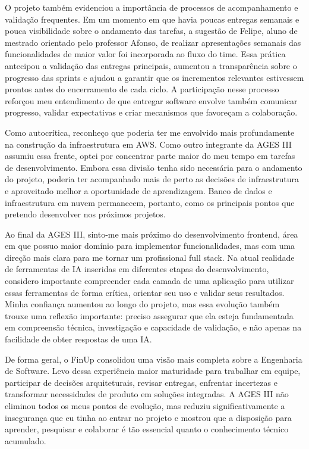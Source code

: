 O projeto também evidenciou a importância de processos de acompanhamento e
validação frequentes. Em um momento em que havia poucas entregas semanais e
pouca visibilidade sobre o andamento das tarefas, a sugestão de Felipe, aluno de
mestrado orientado pelo professor Afonso, de realizar apresentações semanais das
funcionalidades de maior valor foi incorporada ao fluxo do time. Essa prática
antecipou a validação das entregas principais, aumentou a transparência sobre o
progresso das sprints e ajudou a garantir que os incrementos relevantes
estivessem prontos antes do encerramento de cada ciclo. A participação nesse
processo reforçou meu entendimento de que entregar software envolve também
comunicar progresso, validar expectativas e criar mecanismos que favoreçam a
colaboração.

Como autocrítica, reconheço que poderia ter me envolvido mais profundamente na
construção da infraestrutura em AWS. Como outro integrante da AGES III assumiu
essa frente, optei por concentrar parte maior do meu tempo em tarefas de
desenvolvimento. Embora essa divisão tenha sido necessária para o andamento do
projeto, poderia ter acompanhado mais de perto as decisões de infraestrutura e
aproveitado melhor a oportunidade de aprendizagem. Banco de dados e
infraestrutura em nuvem permanecem, portanto, como os principais pontos que
pretendo desenvolver nos próximos projetos.

Ao final da AGES III, sinto-me mais próximo do desenvolvimento frontend, área em
que possuo maior domínio para implementar funcionalidades, mas com uma direção
mais clara para me tornar um profissional full stack. Na atual realidade de
ferramentas de IA inseridas em diferentes etapas do desenvolvimento, considero
importante compreender cada camada de uma aplicação para utilizar essas
ferramentas de forma crítica, orientar seu uso e validar seus resultados. Minha
confiança aumentou ao longo do projeto, mas essa evolução também trouxe uma
reflexão importante: preciso assegurar que ela esteja fundamentada em
compreensão técnica, investigação e capacidade de validação, e não apenas na
facilidade de obter respostas de uma IA.

De forma geral, o FinUp consolidou uma visão mais completa sobre a Engenharia de
Software. Levo dessa experiência maior maturidade para trabalhar em equipe,
participar de decisões arquiteturais, revisar entregas, enfrentar incertezas e
transformar necessidades de produto em soluções integradas. A AGES III não
eliminou todos os meus pontos de evolução, mas reduziu significativamente a
insegurança que eu tinha ao entrar no projeto e mostrou que a disposição para
aprender, pesquisar e colaborar é tão essencial quanto o conhecimento técnico
acumulado.


